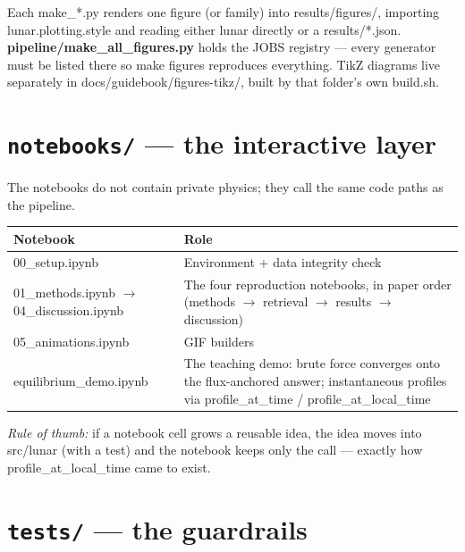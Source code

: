 \documentclass[11pt]{article}
\newcommand{\code}[1]{{\ttfamily\small #1}}
\begin{document}
Each \code{make\_*.py} renders one figure (or family) into
\code{results/figures/}, importing \code{lunar.plotting.style} and reading
either \code{lunar} directly or a \code{results/*.json}.
\textbf{\code{pipeline/make\_all\_figures.py}} holds the \code{JOBS} registry
--- every generator must be listed there so \code{make figures} reproduces
everything. TikZ diagrams live separately in
\code{docs/guidebook/figures-tikz/}, built by that folder's own
\code{build.sh}.

\section{\texttt{notebooks/} --- the interactive layer}

The notebooks do not contain private physics; they call the same code paths
as the pipeline.

\begin{center}\small
\begin{tabularx}{\textwidth}{@{}>{\ttfamily\small}l X@{}}
\toprule
\textnormal{\textbf{Notebook}} & \textbf{Role} \\
\midrule
00\_setup.ipynb & Environment + data integrity check \\
01\_methods.ipynb $\rightarrow$ 04\_discussion.ipynb & The four reproduction notebooks, in paper order (methods $\rightarrow$ retrieval $\rightarrow$ results $\rightarrow$ discussion) \\
05\_animations.ipynb & GIF builders \\
equilibrium\_demo.ipynb & The teaching demo: brute force converges onto the flux-anchored answer; instantaneous profiles via \code{profile\_at\_time} / \code{profile\_at\_local\_time} \\
\bottomrule
\end{tabularx}
\end{center}

\noindent\textit{Rule of thumb:} if a notebook cell grows a reusable idea, the
idea moves into \code{src/lunar} (with a test) and the notebook keeps only the
call --- exactly how \code{profile\_at\_local\_time} came to exist.

\section{\texttt{tests/} --- the guardrails}
\end{document}
